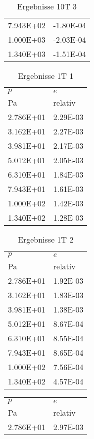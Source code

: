 \begin{table}
\begin{tabular}{l l }
\num{7.943E+02}&\num{-1.80E-04}\\
\num{1.000E+03}&\num{-2.03E-04}\\
\num{1.340E+03}&\num{-1.51E-04}\\
\bottomrule
\end{tabular}\caption{Ergebnisse 10T 3}\end{table}\begin{table}\begin{tabular}{l l }
\toprule
$p$&$e$\\
 Pa & relativ \\\midrule
\num{2.786E+01}&\num{2.29E-03}\\
\num{3.162E+01}&\num{2.27E-03}\\
\num{3.981E+01}&\num{2.17E-03}\\
\num{5.012E+01}&\num{2.05E-03}\\
\num{6.310E+01}&\num{1.84E-03}\\
\num{7.943E+01}&\num{1.61E-03}\\
\num{1.000E+02}&\num{1.42E-03}\\
\num{1.340E+02}&\num{1.28E-03}\\
\bottomrule
\end{tabular}\caption{Ergebnisse 1T 1}\end{table}\begin{table}\begin{tabular}{l l }
\toprule
$p$&$e$\\
 Pa & relativ \\\midrule
\num{2.786E+01}&\num{1.92E-03}\\
\num{3.162E+01}&\num{1.83E-03}\\
\num{3.981E+01}&\num{1.38E-03}\\
\num{5.012E+01}&\num{8.67E-04}\\
\num{6.310E+01}&\num{8.55E-04}\\
\num{7.943E+01}&\num{8.65E-04}\\
\num{1.000E+02}&\num{7.56E-04}\\
\num{1.340E+02}&\num{4.57E-04}\\
\bottomrule
\end{tabular}\caption{Ergebnisse 1T 2}\end{table}\begin{table}\begin{tabular}{l l }
\toprule
$p$&$e$\\
 Pa & relativ \\\midrule
\num{2.786E+01}&\num{2.97E-03}\\

\end{tabular}
\end{table}
